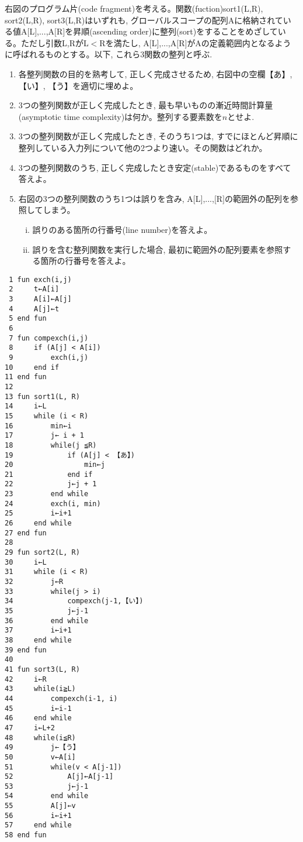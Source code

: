 \documentclass[dvipdfmx,titlepage, 11pt, a4paper]{jsarticle}%
\begin{document}
\begin{enumerate}[(1)]
  \begin{minipage}[t]{8cm}
  \item 右図のプログラム片(code fragment)を考える。関数(fuction)sort1(L,R), sort2(L,R), sort3(L,R)はいずれも, グローバルスコープの配列Aに格納されている値A$[$L$]$,...,A$[$R$]$を昇順(ascending order)に整列(sort)をすることをめざしている。ただし引数L,RがL$<$Rを満たし, A$[$L$]$,...,A$[$R$]$がAの定義範囲内となるように呼ばれるものとする。以下, これら3関数の整列と呼ぶ.
    \begin{enumerate}[({3}$-$a)]
    \item 各整列関数の目的を熟考して, 正しく完成させるため, 右図中の空欄【あ】, 【い】, 【う】を適切に埋めよ。
    \item 3つの整列関数が正しく完成したとき, 最も早いものの漸近時間計算量(asymptotic time complexity)は何か。整列する要素数を$n$とせよ.
    \item 3つの整列関数が正しく完成したとき, そのうち1つは, すでにほとんど昇順に整列している入力列について他の2つより速い。その関数はどれか。
    \item 3つの整列関数のうち, 正しく完成したとき安定(stable)であるものをすべて答えよ。
    \item 右図の3つの整列関数のうち1つは誤りを含み, A$[$L$]$,...,$[$R$]$の範囲外の配列を参照してしまう。
      
      \begin{enumerate}[i)]    
      \item 誤りのある箇所の行番号(line number)を答えよ。
      \item 誤りを含む整列関数を実行した場合, 最初に範囲外の配列要素を参照する箇所の行番号を答えよ。
      \end{enumerate}
      
    \end{enumerate}
  \end{minipage}
  \hfill
  \begin{minipage}[t]{8.5cm}
    \begin{lstlisting}
 1 fun exch(i,j)
 2     t←A[i]
 3     A[i]←A[j]
 4     A[j]←t
 5 end fun
 6
 7 fun compexch(i,j)
 8     if (A[j] < A[i])
 9         exch(i,j)
10     end if
11 end fun
12
13 fun sort1(L, R)
14     i←L
15     while (i < R)
16         min←i
17         j← i + 1
18         while(j ≦R)
19             if (A[j] < 【あ】)
20                 min←j
21             end if
22             j←j + 1
23         end while
24         exch(i, min)
25         i←i+1
26     end while
27 end fun
28
29 fun sort2(L, R)
30     i←L
31     while (i < R)
32         j←R
33         while(j > i)
34             compexch(j-1,【い】)
35             j←j-1
36         end while
37         i←i+1
38     end while
39 end fun
40
41 fun sort3(L, R)
42     i←R
43     while(i≧L)
44         compexch(i-1, i)
45         i←i-1
46     end while
47     i←L+2
48     while(i≦R)
49         j←【う】
50         v←A[i]
51         while(v < A[j-1])
52             A[j]←A[j-1]
53             j←j-1
54         end while
55         A[j]←v
56         i←i+1
57     end while
58 end fun
    \end{lstlisting}
  \end{minipage}
\end{enumerate}
\newpage
\end{document}
